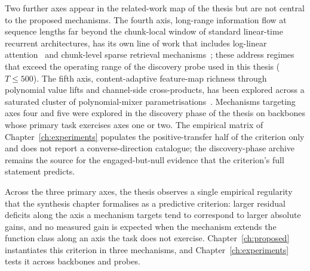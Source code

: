 Two further axes appear in the related-work map of the thesis but
are not central to the proposed mechanisms. The fourth axis,
long-range information flow at sequence lengths far beyond the
chunk-local window of standard linear-time recurrent architectures,
has its own line of work that includes log-linear
attention~\cite{guo2025loglinear} and chunk-level sparse retrieval
mechanisms~\cite{hou2025rwkvx, hu2025hsa}; these address regimes
that exceed the operating range of the discovery probe used in this
thesis ($T \le 500$). The fifth axis, content-adaptive feature-map
richness through polynomial value lifts and channel-side
cross-products, has been explored across a saturated cluster of
polynomial-mixer parametrisations~\cite{mongaras2025expressiveness, picard2026pom, hammoud2025dont, zhang2025hla}.
Mechanisms targeting axes four and five were explored in the
discovery phase of the thesis on backbones whose primary task
exercises axes one or two. The empirical matrix of
Chapter~\ref{ch:experiments} populates the positive-transfer half
of the criterion only and does not report a converse-direction
catalogue; the discovery-phase archive remains the source for the
engaged-but-null evidence that the criterion's full statement
predicts.

Across the three primary axes, the thesis observes a single
empirical regularity that the synthesis chapter formalises as a
predictive criterion: larger residual deficits along the axis a
mechanism targets tend to correspond to larger absolute gains,
and no measured gain is expected when the mechanism extends the
function class along an axis the task does not exercise.
Chapter~\ref{ch:proposed} instantiates this criterion in three
mechanisms, and Chapter~\ref{ch:experiments} tests it across
backbones and probes.

